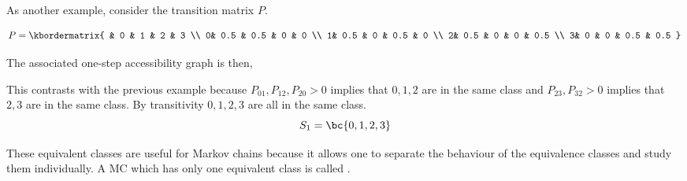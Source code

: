 \documentclass{article}
\begin{document}
\begin{example}

As another example, consider the transition matrix $P$.

\[ P = \kbordermatrix{
    & 0 & 1 & 2 & 3 \\
    0& 0.5 & 0.5 & 0 & 0 \\
    1& 0.5 & 0 & 0.5 & 0 \\
    2& 0.5 & 0 & 0 & 0.5 \\
    3& 0 & 0  & 0.5 & 0.5
 } \]

The associated one-step accessibility graph is then,
\begin{center}
\end{center}
This contrasts with the previous example because $P_{01}, P_{12}, P_{20} > 0$ implies that $0,1,2$ are in the same class and $P_{23}, P_{32} > 0$ implies that $2,3$ are in the same class. By transitivity $0,1,2,3$ are all in the same class.
\[ S_1 = \bc{0,1,2,3} \]
\end{example}

These equivalent classes are useful for Markov chains because it allows one to separate the behaviour of the equivalence classes and study them individually. A MC which has only one equivalent class is called . \\
\end{document}

